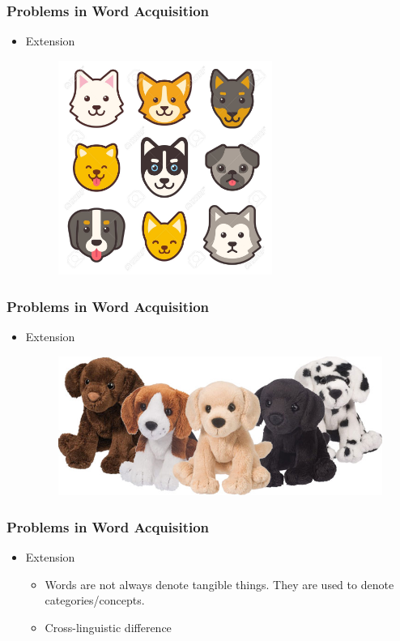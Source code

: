 \documentclass{beamer}
\begin{document}
\begin{frame}
\frametitle{Problems in Word Acquisition}
\begin{itemize}
\item Extension
\begin{figure}
    \includegraphics[height = 7cm, keepaspectratio]{57605685-cartoon-dog-faces-set-different-breeds-of-dogs-cute-flat-icons-.jpg}
\end{figure}
\end{itemize}
\end{frame}
\begin{frame}
\frametitle{Problems in Word Acquisition}
\begin{itemize}
\item Extension
\begin{figure}
    \includegraphics[wideth = \textwidth, keepaspectratio]{Douglas_MiniPups-1.jpg}
\end{figure}
\end{itemize}
\end{frame}
\begin{frame}
\frametitle{Problems in Word Acquisition}
\begin{itemize}
\item Extension 
\begin{itemize}
    \item Words are not always denote tangible things. They are used to denote categories/concepts. 
    \pause 
    \item Cross-linguistic difference
\end{itemize}
\end{itemize}
\end{frame}
\end{document}
